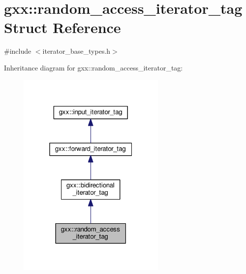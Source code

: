\hypertarget{structgxx_1_1random__access__iterator__tag}{}\section{gxx\+:\+:random\+\_\+access\+\_\+iterator\+\_\+tag Struct Reference}
\label{structgxx_1_1random__access__iterator__tag}


{\ttfamily \#include $<$iterator\+\_\+base\+\_\+types.\+h$>$}



Inheritance diagram for gxx\+:\+:random\+\_\+access\+\_\+iterator\+\_\+tag\+:
\nopagebreak
\begin{figure}[H]
\begin{center}
\leavevmode
\includegraphics[width=205pt]{structgxx_1_1random__access__iterator__tag__inherit__graph}
\end{center}
\end{figure}


